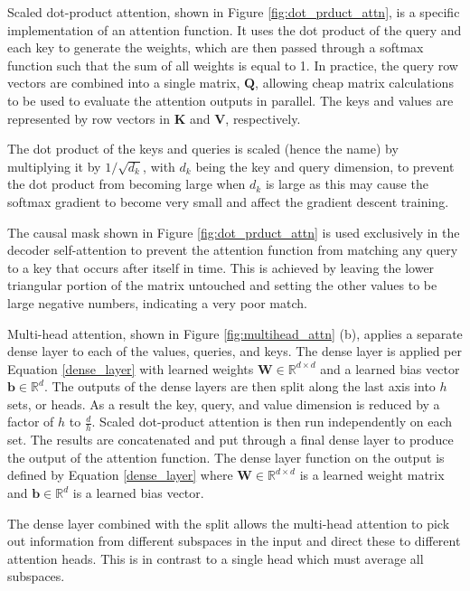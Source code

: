 Scaled dot-product attention, shown in Figure \ref{fig:dot_prduct_attn}, is a specific implementation of an attention function. 
It uses the dot product of the query and each key to generate the weights, which are then passed through a softmax function such that the sum of all weights is equal to 1.
In practice, the query row vectors are combined into a single matrix, $\boldsymbol{Q}$, allowing cheap matrix calculations to be used to evaluate the attention outputs in parallel.
The keys and values are represented by row vectors in $\boldsymbol{K}$ and $\boldsymbol{V}$, respectively.

The dot product of the keys and queries is scaled (hence the name) by multiplying it by $1 / \sqrt{d_k}$, with $d_k$ being the key and query dimension, to prevent the dot product from becoming large when $d_k$ is large as this may cause the softmax gradient to become very small and affect the gradient descent training.

The causal mask shown in Figure \ref{fig:dot_prduct_attn} is used exclusively in the decoder self-attention to prevent the attention function from matching any query to a key that occurs after itself in time.
This is achieved by leaving the lower triangular portion of the matrix untouched and setting the other values to be large negative numbers, indicating a very poor match.

Multi-head attention, shown in Figure \ref{fig:multihead_attn} (b), applies a separate dense layer to each of the values, queries, and keys. 
The dense layer is applied per Equation \ref{dense_layer} with learned weights $\boldsymbol{W} \in \mathbb{R}^{d \times d}$ and a learned bias vector $\boldsymbol{b} \in \mathbb{R}^{d}$.
The outputs of the dense layers are then split along the last axis into $h$ sets, or heads.
As a result the key, query, and value dimension is reduced by a factor of $h$ to $\frac{d}{h}$.
Scaled dot-product attention is then run independently on each set.
The results are concatenated and put through a final dense layer to produce the output of the attention function.
The dense layer function on the output is defined by Equation \ref{dense_layer} where $\boldsymbol{W} \in \mathbb{R}^{d \times d}$ is a learned weight matrix and $\boldsymbol{b} \in \mathbb{R}^{d}$ is a learned bias vector.

The dense layer combined with the split allows the multi-head attention to pick out information from different subspaces in the input and direct these to different attention heads.
This is in contrast to a single head which must average all subspaces.

